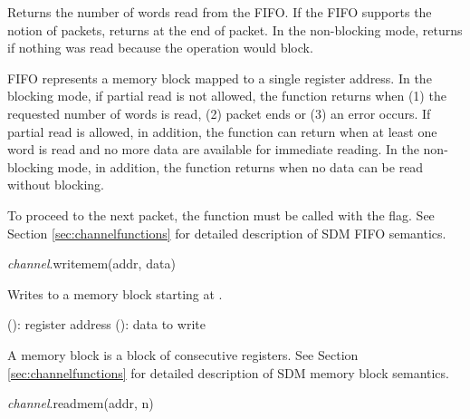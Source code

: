 \documentclass[a4paper,12pt,twoside,extrafontsizes]{memoir}
\begin{document}
\begin{funcret}
	Returns the number of words read from the FIFO. If the FIFO supports the notion of packets, returns  at the end of packet. In the non-blocking mode, returns  if nothing was read because the operation would block.
\end{funcret}

\begin{funcremarks}
	FIFO represents a memory block mapped to a single register address. In the blocking mode, if partial read is not allowed, the function returns when (1) the requested number of words is read, (2) packet ends or (3) an error occurs. If partial read is allowed, in addition, the function can return when at least one word is read and no more data are available for immediate reading. In the non-blocking mode, in addition, the function returns when no data can be read without blocking.
	
	To proceed to the next packet, the function must be called with the  flag. See Section \ref{sec:channelfunctions} for detailed description of SDM FIFO semantics.
\end{funcremarks}


\begin{luafuncprototype}
\emph{channel}.writemem(addr, data)
\end{luafuncprototype}

\begin{funcdescr}
	Writes  to a memory block starting at .
\end{funcdescr}

\begin{funcparams}
	 (): register address
	 (): data to write
\end{funcparams}

\begin{funcremarks}
	A memory block is a block of consecutive registers. See Section \ref{sec:channelfunctions} for detailed description of SDM memory block semantics.
\end{funcremarks}


\begin{luafuncprototype}
\emph{channel}.readmem(addr, n)
\end{luafuncprototype}
\end{document}

